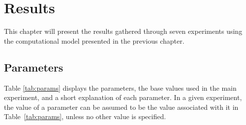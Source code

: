 \acresetall
\chapter{Results}\label{ch:Results}

This chapter will present the results gathered through seven experiments using the computational model presented in the previous chapter.

\section{Parameters}
Table \ref{tab:params} displays the parameters, the base values used in the main experiment, and a short explanation of each parameter. In a given experiment, the value of a parameter can be assumed to be the value associated with it in Table~\ref{tab:params}, unless no other value is specified.    

